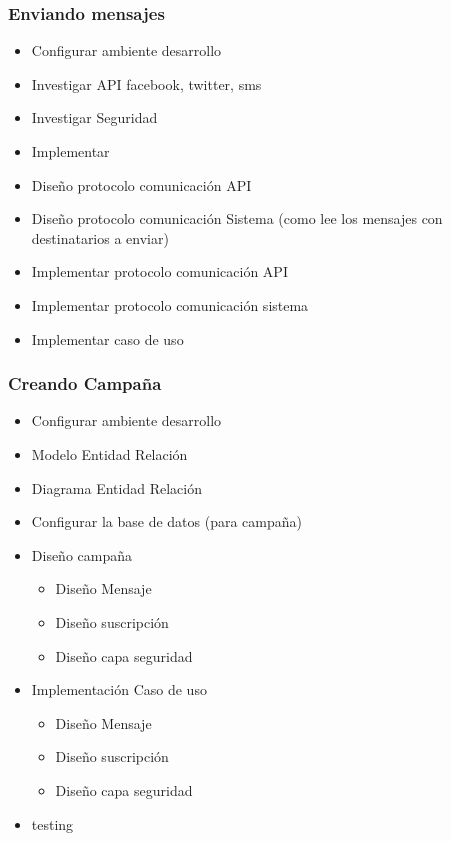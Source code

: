 \documentclass[a4paper, 11pt]{article}
\begin{document}
\subsubsection{Enviando mensajes}
\begin{itemize}
\item Configurar ambiente desarrollo
\item Investigar API facebook, twitter, sms
\item Investigar Seguridad
\item Implementar 
\item Dise\~no protocolo comunicaci\'on API 
\item Dise\~no protocolo comunicaci\'on Sistema  (como lee los mensajes con destinatarios a enviar)
\item Implementar protocolo comunicaci\'on API
\item Implementar protocolo comunicaci\'on sistema
\item Implementar caso de uso
\end{itemize}

\subsubsection{Creando Campa\~na}
\begin{itemize}
\item Configurar ambiente desarrollo
\item Modelo Entidad Relaci\'on
\item Diagrama Entidad Relaci\'on
\item Configurar la base de datos (para campa\~na)
\item Dise\~no campa\~na
\begin{itemize}
\item Dise\~no Mensaje
\item Dise\~no suscripci\'on
\item Dise\~no capa seguridad
\end{itemize}
\item Implementaci\'on Caso de uso
\begin{itemize}
\item Dise\~no Mensaje
\item Dise\~no suscripci\'on
\item Dise\~no capa seguridad
\end{itemize}
\item testing
\end{itemize}
\end{document}
